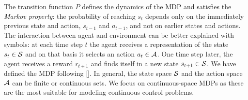 \noindent The transition function $P$ defines the dynamics of the \ac{MDP} and satisfies the \emph{Markov property}: the probability of reaching $s_t$ depends only on the immediately previous state and action, $s_{t-1}$ and $a_{t-1}$, and not on earlier states and actions.\\
\newline
The interaction between agent and environment can be better explained with symbols: at each time step $t$ the agent receives a representation of the state $s_t \in \mathcal{S}$ and on that basis it selects an action $a_t \in \mathcal{A}$. One time step later, the agent receives a reward $r_{t+1}$ and finds itself in a new state $s_{t+1} \in \mathcal{S}$. We have defined the \ac{MDP} following [\cite{puterman2014markov}]. In general, the state space $\mathcal{S}$ and the action space $\mathcal{A}$ can be finite or continuous sets. We focus on continuous-space \ac{MDPs} as these are the most suitable for modeling continuous control problems.
